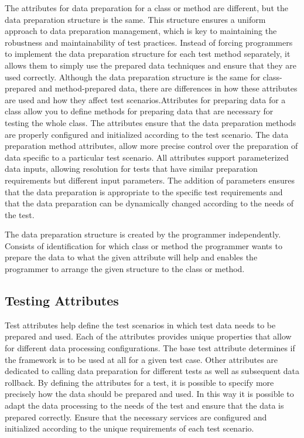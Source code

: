 The attributes for data preparation for a class or method are different, but the data preparation structure is the same. This structure ensures a uniform approach to data preparation management, which is key to maintaining the robustness and maintainability of test practices. Instead of forcing programmers to implement the data preparation structure for each test method separately, it allows them to simply use the prepared data techniques and ensure that they are used correctly.
Although the data preparation structure is the same for class-prepared and method-prepared data, there are differences in how these attributes are used and how they affect test scenarios.Attributes for preparing data for a class allow you to define methods for preparing data that are necessary for testing the whole class. The attributes ensure that the data preparation methods are properly configured and initialized according to the test scenario. The data preparation method attributes, allow more precise control over the preparation of data specific to a particular test scenario. 
All attributes support parameterized data inputs, allowing resolution for tests that have similar preparation requirements but different input parameters. The addition of parameters ensures that the data preparation is appropriate to the specific test requirements and that the data preparation can be dynamically changed according to the needs of the test.

The data preparation structure is created by the programmer independently. Consists of identification for which class or method the programmer wants to prepare the data to what the given attribute will help and enables the programmer to arrange the given structure to the class or method.



\subsection*{Testing Attributes}

Test attributes help define the test scenarios in which test data needs to be prepared and used. Each of the attributes provides unique properties that allow for different data processing configurations. The base test attribute determines if the framework is to be used at all for a given test case. Other attributes are dedicated to calling data preparation for different tests as well as subsequent data rollback. By defining the attributes for a test, it is possible to specify more precisely how the data should be prepared and used. In this way it is possible to adapt the data processing to the needs of the test and ensure that the data is prepared correctly.
Ensure that the necessary services are configured and initialized according to the unique requirements of each test scenario.


